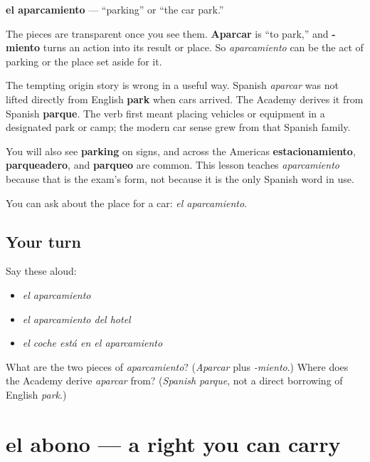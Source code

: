 \begin{cousinweb}
\textbf{el aparcamiento} — \textquotedblleft{}parking\textquotedblright{} or \textquotedblleft{}the car park.\textquotedblright{}

The pieces are transparent once you see them. \textbf{Aparcar} is \textquotedblleft{}to park,\textquotedblright{} and \textbf{-miento} turns an action into its result or place. So \emph{aparcamiento} can be the act of parking or the place set aside for it.

The tempting origin story is wrong in a useful way. Spanish \emph{aparcar} was not lifted directly from English \textbf{park} when cars arrived. The Academy derives it from Spanish \textbf{parque}. The verb first meant placing vehicles or equipment in a designated park or camp; the modern car sense grew from that Spanish family.

You will also see \textbf{parking} on signs, and across the Americas \textbf{estacionamiento}, \textbf{parqueadero}, and \textbf{parqueo} are common. This lesson teaches \emph{aparcamiento} because that is the exam's form, not because it is the only Spanish word in use.
\end{cousinweb}

\begin{grammarlens}[title={What you've built}]
You can ask about the place for a car: \emph{el aparcamiento}.
\end{grammarlens}

\subsection*{Your turn}
Say these aloud:

\begin{itemize}
\raggedright
  \item \emph{el aparcamiento}
  \item \emph{el aparcamiento del hotel}
  \item \emph{el coche está en el aparcamiento}
\end{itemize}

\begin{tcolorbox}[breakable,colback=teal!4,colframe=teal!35!black,title={Before you move on}]
What are the two pieces of \emph{aparcamiento}? (\emph{Aparcar} plus \emph{-miento}.) Where does the Academy derive \emph{aparcar} from? (\emph{Spanish parque}, not a direct borrowing of English \emph{park}.)
\end{tcolorbox}
\section[el abono]{el abono — a right you can carry}

